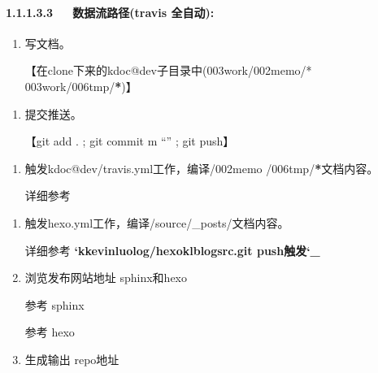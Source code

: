 \documentclass[letterpaper,12pt,english]{sphinxmanual}
\begin{document}
\paragraph{1.1.1.3.3   数据流路径(travis 全自动):}
\label{\detokenize{001software/001install/001._u7f51_u7ad9/gitpage:travis}}\begin{enumerate}
%
\item {} 
写文档。

【在clone下来的kdoc@dev子目录中(003work/002memo/* 003work/006tmp/{\color{red}\bfseries{}*})】

\end{enumerate}
\begin{enumerate}
%
\setcounter{enumi}{2}
\item {} 
提交推送。

【git add . ; git commit \sphinxhyphen{}m “” ; git push】

\end{enumerate}
\begin{enumerate}
%
\setcounter{enumi}{4}
\item {} 
触发kdoc@dev/travis.yml工作，编译/002memo /006tmp/{\color{red}\bfseries{}*}文档内容。

详细参考  {\hyperref[\detokenize{001software/001install/001._u7f51_u7ad9/gitpage:kevinluolog-kdoc-git-push}]{}}

\end{enumerate}
\begin{enumerate}
%
\setcounter{enumi}{3}
\item {} 
触发hexo\sphinxhyphen{}.yml工作，编译/source/\_posts/文档内容。

详细参考  {\color{red}\bfseries{}`kkevinluolog/hexo\sphinxhyphen{}klblog\sphinxhyphen{}src.git push触发`\_}

\item {} 
浏览发布网站地址 sphinx和hexo

参考 {\hyperref[\detokenize{001software/001install/001._u7f51_u7ad9/gitpage:kdoc}]{}} sphinx

参考 {\hyperref[\detokenize{001software/001install/001._u7f51_u7ad9/gitpage:hexo-klblog-src}]{}}  hexo

\item {} 
生成输出 repo地址


\end{enumerate}
\end{document}
